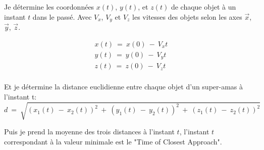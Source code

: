 \documentclass[a4paper, 11pt]{article}
\begin{document}
	Je détermine les coordonnées $x(t)$, $y(t)$, et $z(t)$ de chaque objet à un instant $t$ dans le passé. Avec $V_x$, $V_y$ et $V_z$ les vitesses des objets selon les axes $\vec{x}$, $\vec{y}$, $\vec{z}$.
	
	\begin{align}
		x(t) \ = \ x(0) \ - \ V_xt \\
		y(t) \ = \ y(0) \ - \ V_yt \\
		z(t) \ = \ z(0) \ - \ V_zt \\
	\end{align}
	
	Et je détermine la distance euclidienne entre chaque objet d'un super-amas à l'instant t:
	$$d \ = \ \sqrt{(x_1(t) \ - \ x_2(t))^2 \ + \ (y_1(t) \ - \ y_2(t))^2 \ + \ (z_1(t) \ - \ z_2(t))^2}$$
	
	Puis je prend la moyenne des trois distances à l'instant $t$, l'instant $t$ correspondant à la valeur minimale est le "Time of Closest Approach".
	
	\newpage
	
\end{document}
